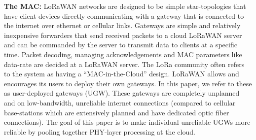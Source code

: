 \vspace*{0.02in}

\noindent \textbf{The MAC: }  LoRaWAN networks
are designed to be simple star-topologies that have client devices directly
communicating with a gateway that is connected to the internet over ethernet
or cellular links. Gateways are simple and relatively inexpensive forwarders that send received packets to a cloud LoRaWAN server and can be commanded by the server to transmit data to clients at a specific time. Packet decoding, managing acknowledgements and
MAC parameters like data-rate are decided at a LoRaWAN
server. The LoRa community often refers to the system as having a
``MAC-in-the-Cloud'' design. LoRaWAN allows and encourages its users to deploy their own gateways. In this
paper, we refer to these as user-deployed gateways (UGW). These gateways are
completely unplanned and on low-bandwidth, unreliable internet connections
(compared to cellular base-stations which are extensively planned and have
dedicated optic fiber connections). The goal of this paper is to make individual unreliable UGWs more reliable by pooling together PHY-layer processing at the cloud.  




